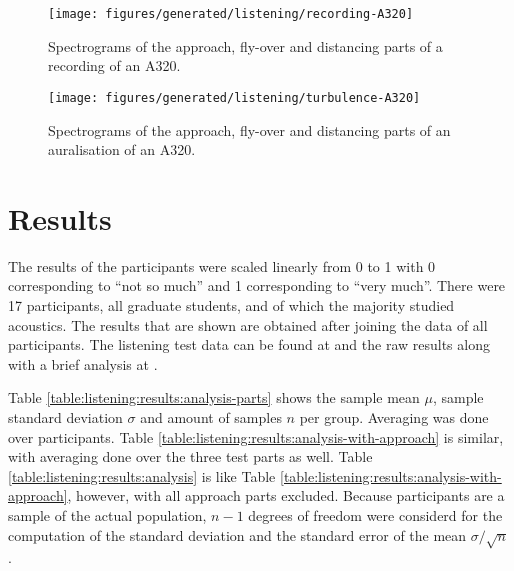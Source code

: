 \documentclass[10pt,twocolumn]{article}
\begin{document}
\begin{figure}[H]
  \centering
  \texttt{[image: figures/generated/listening/recording-A320]}
  \caption{Spectrograms of the approach, fly-over and distancing parts of a recording of an A320.}
  \label{fig:listening:results:recording-A320}
%
  \centering
  \texttt{[image: figures/generated/listening/turbulence-A320]}
  \caption{Spectrograms of the approach, fly-over and distancing parts of an auralisation of an A320.}
  \label{fig:listening:results:simulation-A320}
\end{figure}

\section{Results}
The results of the participants were scaled linearly from 0 to 1 with 0
corresponding to ``not so much'' and 1 corresponding to ``very much''.
There were 17 participants, all graduate students, and of which the majority
studied acoustics. The results that are shown are obtained after joining the
data of all participants. %
The listening test data can be found at \cite{Rietdijk2017a} and the
raw results along with a brief analysis at \cite{Rietdijk2017b}.

Table \ref{table:listening:results:analysis-parts} shows the sample mean $\mu$,
sample standard deviation $\sigma$ and amount of samples $n$ per group. Averaging was
done over participants. Table
\ref{table:listening:results:analysis-with-approach} is similar, with averaging
done over the three test parts as well. Table
\ref{table:listening:results:analysis} is like Table
\ref{table:listening:results:analysis-with-approach}, however, with all approach
parts excluded. Because participants are a sample of the actual
population, $n-1$ degrees of freedom were considerd for the computation of the
standard deviation and the standard error of the mean $\sigma/\sqrt{n}$.
\end{document}
